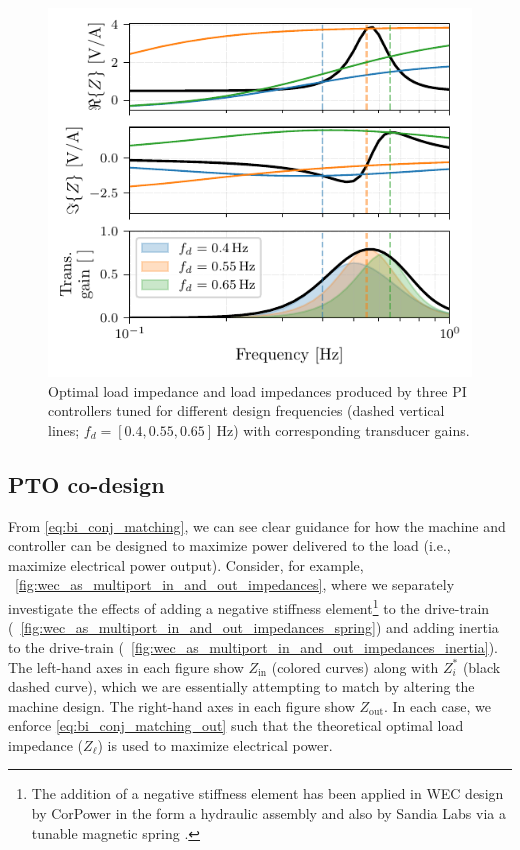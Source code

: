 \documentclass[lettersize,journal]{IEEEtran}
\begin{document}
\begin{figure}[tb]
        \centering
        \includegraphics[width=1\columnwidth]{wec_as_multiport_pi_controllers_real_imag.pdf}
        \caption{Optimal load impedance and load impedances produced by three PI controllers tuned for different design frequencies (dashed vertical lines; $f_d = [0.4, 0.55, 0.65]$\,Hz) with corresponding transducer gains.}
        \label{fig:gfx/wec_as_multiport_pi_controllers_real_imag}
\end{figure}

\subsection{PTO co-design}\label{sec:pto_codesign}
From \eqref{eq:bi_conj_matching}, we can see clear guidance for how the machine and controller can be designed to maximize power delivered to the load (i.e., maximize electrical power output).
Consider, for example, \figurename~\ref{fig:wec_as_multiport_in_and_out_impedances}, where we separately investigate the effects of adding a negative stiffness element\footnote{The addition of a negative stiffness element has been applied in WEC design by CorPower in the form a hydraulic assembly \cite{Todalshaug:2016aa} and also by Sandia Labs via a tunable magnetic spring \cite{Forbush:2024aa}.} to the drive-train (\figurename~\ref{fig:wec_as_multiport_in_and_out_impedances_spring}) and adding inertia to the drive-train (\figurename~\ref{fig:wec_as_multiport_in_and_out_impedances_inertia}).
The left-hand axes in each figure show $Z_{\textrm{in}}$ (colored curves) along with $Z_i^*$ (black dashed curve), which we are essentially attempting to match by altering the machine design.
The right-hand axes in each figure show $Z_{\textrm{out}}$.
In each case, we enforce \eqref{eq:bi_conj_matching_out} such that the theoretical optimal load impedance ($Z_\ell$) is used to maximize electrical power.
\end{document}
